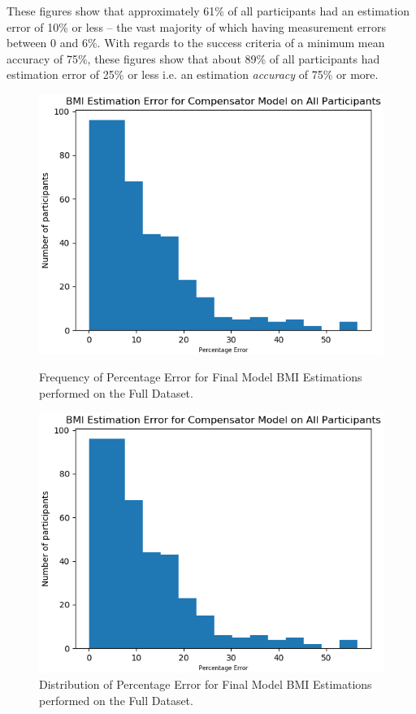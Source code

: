 \documentclass[conference]{IEEEtran}
\begin{document}
These figures show that approximately 61\% of all participants had an estimation error of 10\% or less -- the vast majority of which having measurement errors between 0 and 6\%.
With regards to the success criteria of a minimum mean accuracy of 75\%, these figures show that about 89\% of all participants had estimation error of 25\% or less i.e. an estimation \textit{accuracy} of 75\% or more.
\begin{figure}
\centering
\begin{minipage}[b]{0.235\textwidth}
	\includegraphics[width=\linewidth]{errorspread.png}
	\caption{Frequency of Percentage Error for Final Model BMI Estimations performed on the Full Dataset.}
	\label{fig:errorspread}
	\end{minipage}
\hspace{0.1cm}
\begin{minipage}[b]{0.235\textwidth}
	\includegraphics[width=\linewidth]{errorspread.png}
	\caption{Distribution of Percentage Error for Final Model BMI Estimations performed on the Full Dataset.}
	\label{fig:errordist}
	\end{minipage}
\end{figure}
\end{document}
